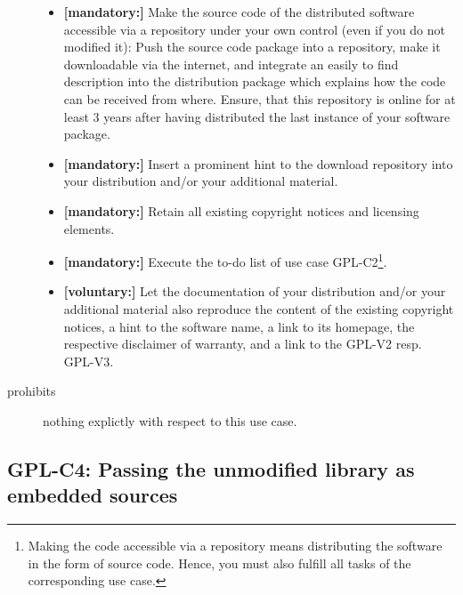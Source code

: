 \begin{description}
\begin{itemize}
  \item \textbf{[mandatory:]} Make the source code of the distributed software
  accessible via a repository under your own control (even if you do not
  modified it): Push the source code package into a repository, make it
  downloadable via the internet, and integrate an easily to find description
  into the distribution package which explains how the code can be received from
  where. Ensure, that this repository is online for at least 3 years after
  having distributed the last instance of your software package.
  
  \item \textbf{[mandatory:]} Insert a prominent hint to the download repository
  into your distribution and/or your additional material.

  \item \textbf{[mandatory:]} Retain all existing copyright notices and
  licensing elements.
    
  \item \textbf{[mandatory:]} Execute the to-do list of use case GPL-C2\footnote{
  Making the code accessible via a repository means distributing the software in
  the form of source code. Hence, you must also fulfill all tasks of the
  corresponding use case.}.

  \item \textbf{[voluntary:]} Let the documentation of your distribution and/or
  your additional material also reproduce the content of the existing
  copyright notices, a hint to the software name, a link to its homepage,
  the respective disclaimer of warranty, and a link to the GPL-V2 resp.
  GPL-V3.

\end{itemize}

\item[prohibits] nothing explictly with respect to this use case.

\end{description}

\subsection{GPL-C4: Passing the unmodified library as embedded sources}
\label{OSUC-07S-GPL} 

